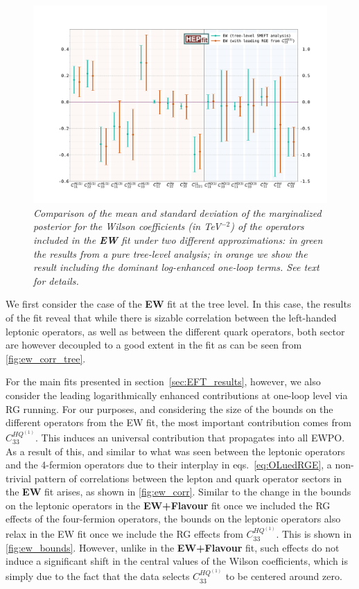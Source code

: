 \begin{figure}[t]
	\centering
	\includegraphics[width=\textwidth]{figures/errorbar_EW.pdf}
	\caption{\it Comparison of the mean and standard deviation of the marginalized posterior for the Wilson coefficients (in TeV$^{-2}$) of the operators included in the {\bf EW} fit under two different approximations: in green the results from a pure tree-level analysis; in orange we show the result including the dominant log-enhanced one-loop terms. See text for details. }
	\label{fig:ew_bounds}
\end{figure}

We first consider the case of the {\bf EW} fit at the tree level. In this case, the results of the fit reveal that while there is sizable correlation between the left-handed leptonic operators, as well as between the different quark operators, both sector are however decoupled to a good extent in the fit as can be seen from \autoref{fig:ew_corr_tree}.

For the main fits presented in section~\ref{sec:EFT_results}, however, we also consider the leading logarithmically enhanced contributions at one-loop level via RG running. For our purposes, and considering the size of the bounds on the different operators from the EW fit, the most important contribution comes from $C^{HQ^{(1)}}_{33}$. This induces an universal contribution that propagates into all EWPO. As a result of this, and similar to what was seen between the leptonic operators and the 4-fermion operators due to their interplay in eqs.~\eqref{eq:OLuedRGE}, a non-trivial pattern of correlations between the lepton and quark operator sectors in the {\bf EW} fit arises, as shown in \autoref{fig:ew_corr}. Similar to the change in the bounds on the leptonic operators in the {\bf EW+Flavour} fit once we included the RG effects of the four-fermion operators, the bounds on the leptonic operators also relax in the EW fit once we include the RG effects from $C^{HQ^{(1)}}_{33}$. This is shown in \autoref{fig:ew_bounds}. However, unlike in the {\bf EW+Flavour} fit, such effects do not induce a significant shift in the central values of the Wilson coefficients, which is simply due to the fact that the data selects $C^{HQ^{(1)}}_{33}$ to be centered around zero. 

